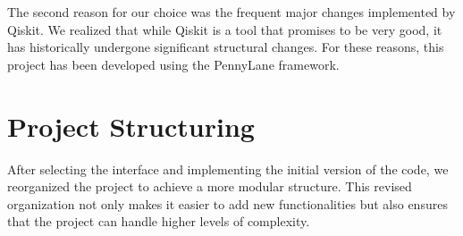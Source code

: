 The second reason for our choice was the frequent major changes implemented by Qiskit. We realized that while Qiskit is a tool that promises to be very good, it has historically undergone significant structural changes. For these reasons, this project has been developed using the PennyLane framework.

\section{Project Structuring}

After selecting the interface and implementing the initial version of the code, we reorganized the project to achieve a more modular structure. This revised organization not only makes it easier to add new functionalities but also ensures that the project can handle higher levels of complexity.

